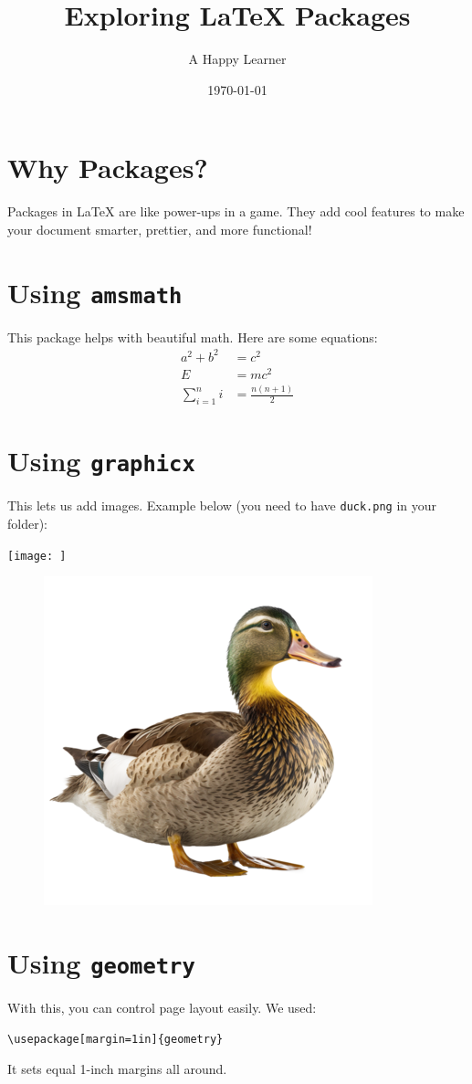 \documentclass{article}
\title{Exploring LaTeX Packages}
\author{A Happy Learner}
\date{\today}
\begin{document}
\maketitle
\tableofcontents


\section{Why Packages?}
Packages in LaTeX are like power-ups in a game. They add cool features to make your document smarter, prettier, and more functional!

\section{Using \texttt{amsmath}}
This package helps with beautiful math. Here are some equations:
\begin{align}
    a^2 + b^2 &= c^2 \\
    E &= mc^2 \\
    \sum_{i=1}^n i &= \frac{n(n+1)}{2}
\end{align}

\section{Using \texttt{graphicx}}
This lets us add images. Example below (you need to have \texttt{duck.png} in your folder):

\begin{center}
\texttt{[image: ]}
\begin{figure}
    \centering
    \includegraphics[width=0.5\linewidth]{session3/duck.png}
    \label{fig:enter-label}
\end{figure}
\end{center}

\section{Using \texttt{geometry}}
With this, you can control page layout easily. We used:
\begin{verbatim}
\usepackage[margin=1in]{geometry}
\end{verbatim}
It sets equal 1-inch margins all around.
\end{document}
